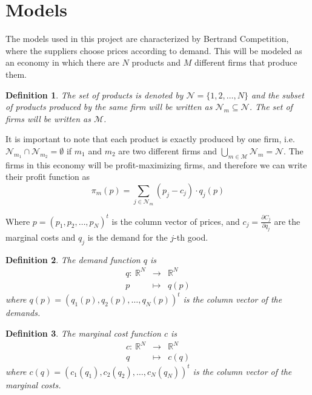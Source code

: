 \documentclass[12pt]{article}
\newtheorem{defi}{{Definition}}
\begin{document}
\section{Models}

The models used in this project are characterized by Bertrand Competition, where the suppliers choose prices according to demand. This will be modeled as an economy in which there are $N$ products and $M$ different firms that produce them.

\begin{defi}
The set of products is denoted by $\mathcal{N} = \{1, 2, \dots, N\}$ and the subset of products produced by the same firm will be written as $\mathcal{N}_m \subseteq \mathcal{N}$. The set of firms will be written as $\mathcal{M}$.
\end{defi}

It is important to note that each product is exactly produced by one firm, i.e.  $\mathcal{N}_{m_1} \cap \mathcal{N}_{m_2} = \emptyset$ if $m_1$ and $m_2$ are two different firms and $\bigcup\limits_{m\in\mathcal{M}} \mathcal{N}_m = \mathcal{N}$. The firms in this economy will be profit-maximizing firms, and therefore we can write their profit function as
\begin{equation}
\pi_m(p) = \sum_{j \in \mathcal{N}_m} (p_j - c_j) \cdot q_j(p) \label{profit_eq}
\end{equation}

Where $p = (p_1, p_2, \dots, p_N)^t$ is the column vector of prices, and $c_j = \frac{\partial C_j}{\partial q_j}$ are the marginal costs and $q_j$ is the demand for the $j$-th good. 

\begin{defi}
The demand function $q$ is
\begin{eqnarray*}
q: ~ \mathbb{R}^N & \rightarrow & \mathbb{R}^N \\
p & \mapsto & q(p)
\end{eqnarray*}
where $q(p) = (q_1(p), q_2(p), \dots, q_N(p))^t$ is the column vector of the demands.
\end{defi}

\begin{defi}
The marginal cost function $c$ is
\begin{eqnarray*}
c: ~ \mathbb{R}^N & \rightarrow & \mathbb{R}^N \\
q & \mapsto & c(q)
\end{eqnarray*}
where $c(q) = (c_1(q_1), c_2(q_2), \dots, c_N(q_N))^t$ is the column vector of the marginal costs.
\end{defi}
\end{document}
